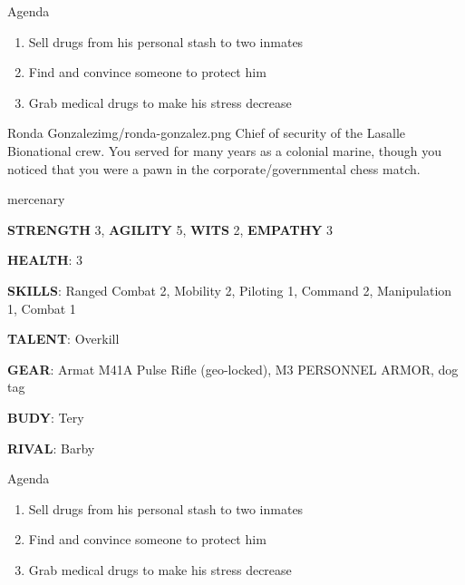 \begin{rpg-commentbox}{Agenda}
    \begin{enumerate}[label=\textbf{Act \arabic*}, leftmargin=1cm]
        \item Sell drugs from his personal stash to two inmates
        \item Find and convince someone to protect him
        \item Grab medical drugs to make his stress decrease
    \end{enumerate}
\end{rpg-commentbox}



\clearpage

\begin{rpg-pcbox}{Ronda Gonzalez}{img/ronda-gonzalez.png}
    Chief of security of the Lasalle Bionational crew. You served for many years as a colonial marine, though you noticed that you were a pawn in the corporate/governmental chess match.
\end{rpg-pcbox}

\begin{rpg-commentbox}{}
    mercenary

    \textbf{STRENGTH} 3, \textbf{AGILITY} 5, \textbf{WITS} 2, \textbf{EMPATHY} 3

    \textbf{HEALTH}: 3

    \textbf{SKILLS}: Ranged Combat 2, Mobility 2, Piloting 1, Command 2, Manipulation 1, Combat 1
    
    \textbf{TALENT}: Overkill
    
    \textbf{GEAR}: Armat M41A Pulse Rifle (geo-locked), M3 PERSONNEL ARMOR, dog tag

    \textbf{BUDY}: Tery
    
    \textbf{RIVAL}: Barby
\end{rpg-commentbox}


\begin{rpg-commentbox}{Agenda}
    \begin{enumerate}[label=\textbf{Act \arabic*}, leftmargin=1cm]
        \item Sell drugs from his personal stash to two inmates
        \item Find and convince someone to protect him
        \item Grab medical drugs to make his stress decrease
    \end{enumerate}
\end{rpg-commentbox}


